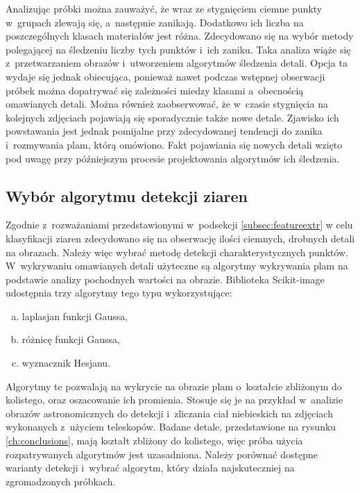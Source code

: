 Analizując próbki można zauważyć, że wraz ze stygnięciem ciemne punkty
w~grupach zlewają się, a~następnie zanikają.
Dodatkowo ich liczba na poszczególnych klasach materiałów jest różna.
Zdecydowano się na wybór metody polegającej na śledzeniu liczby tych punktów
i~ich zaniku.
Taka analiza wiąże się z~przetwarzaniem obrazów i~utworzeniem algorytmów
śledzenia detali.
Opcja ta wydaje się jednak obiecująca, ponieważ nawet podczas wstępnej
obserwacji próbek można dopatrywać się zależności miedzy klasami a~obecnością
omawianych detali.
Można również zaobserwować, że w~czasie stygnięcia na kolejnych zdjęciach
pojawiają się sporadycznie także nowe detale.
Zjawisko ich powstawania jest jednak pomijalne przy zdecydowanej tendencji
do zanika i~rozmywania plam, którą omówiono.
Fakt pojawiania się nowych detali wzięto pod uwagę przy późniejszym procesie
projektowania algorytmów ich śledzenia.

\subsection{Wybór algorytmu detekcji ziaren} \label{subsec:blobdetect}
Zgodnie z~rozważaniami przedstawionymi w~podsekcji \ref{subsec:featureextr}
w celu klasyfikacji ziaren zdecydowano się na obserwację ilości ciemnych,
drobnych detali na obrazach.
Należy więc wybrać metodę detekcji charakterystycznych punktów.
W~wykrywaniu omawianych detali użyteczne są algorytmy wykrywania plam na
podstawie analizy pochodnych wartości na obrazie.
Biblioteka Scikit-image udostępnia trzy algorytmy tego typu wykorzystujące:
\begin{enumerate}[a)]
	\item laplasjan funkcji Gaussa,
	\item różnicę funkcji Gaussa,
	\item wyznacznik Hesjanu.
\end{enumerate}
Algorytmy te pozwalają na wykrycie na obrazie plam o~kształcie zbliżonym
do kolistego, oraz oszacowanie ich promienia.
Stosuje się je na przykład w~analizie obrazów astronomicznych do detekcji
i~zliczania ciał niebieskich na zdjęciach wykonanych z~użyciem teleskopów.
Badane detale, przedstawione na rysunku \ref{ch:conclusions},
mają kształt zbliżony do kolistego, więc próba użycia rozpatrywanych
algorytmów jest uzasadniona.
Należy porównać dostępne warianty detekcji i~wybrać algorytm, który
działa najskuteczniej na zgromadzonych próbkach.

